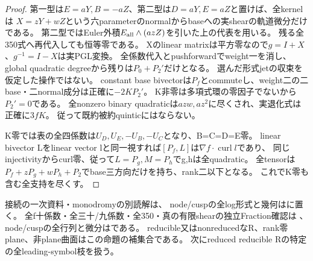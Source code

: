 \documentclass[a4paper,11pt]{ltjsarticle}
\theoremstyle{definition}
\begin{document}
\begin{proof}
第一型は$E=aY,B=-aZ$、第二型は$D=aY,E=aZ$と置けば、全kernelは
$X=zY+wZ$という六parameterのnormalからbaseへの実shearの軌道微分だけである。
第二型ではEuler外積$E_{\rm all}\wedge(azZ)$を引いた上の代表を用いる。
残る全350式へ再代入しても恒等零である。
Xのlinear matrixは平方零なので$g=I+X$、$g^{-1}=I-X$は実PGL変換。
全係数代入とpushforwardでweight一を消し、global quadratic degreeから残りは$P_0+P_2'$だけとなる。
選んだ形式jetの収束を仮定した操作ではない。
constant base bivectorは$P_f$とcommuteし、weight二の二base・二normal成分は正確に$-2K P_2'$。
K非零は多項式環の零因子でないから$P_2'=0$である。
全nonzero binary quadraticは$azw,az^2$に尽くされ、実退化式は正確に$3fK$。
従って既約被約quinticにはならない。

K零では表の全四係数は$U_D,U_E,-U_B,-U_C$となり、B=C=D=E零。
linear bivector Lをlinear vector lと同一視すれば$[P_f,L]$は$\nabla f\cdot\operatorname{curl}l$であり、
同じinjectivityからcurl零、従って$L=P_g,M=P_h$でg,hは全quadratic。
全tensorは$P_f+zP_g+wP_h+P_2$でbase三方向だけを持ち、rank二以下となる。
これでK零も含む全支持を尽くす。
\end{proof}
接続の一次資料・monodromyの別読解は、
node/cuspの全log形式と幾何はに置く。
全f十係数・全三十/九係数・全350・真の有限shearの独立Fraction確認は
、
node/cuspの全行列と微分はである。
reducible又はnonreducedなR、rank零plane、非plane曲面はこの命題の補集合である。
次にreduced reducible Rの特定の全leading-symbol枝を扱う。
\end{document}
